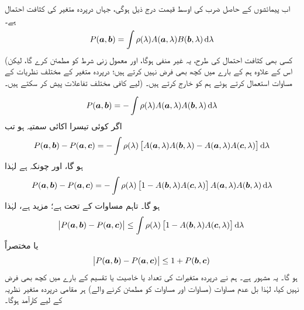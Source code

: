  اب پیمائشوں کے  حاصل ضرب کی اوسط قیمت درج ذیل ہوگی،  جہاں  درپردہ متغیر کی کثافت احتمال ہے۔
\begin{align}
	P(\kvec{a}, \kvec{b}) = \int\rho(\lambda)A(\kvec{a}, \lambda)B(\kvec{b}, \lambda)\dif\lambda
\end{align}
(کسی بھی کثافت  احتمال کی طرح،  یہ غیر منفی ہوگا،  اور معمول زنی شرط  کو مطمئن کرے گا،  لیکن  اس کے علاوہ ہم  کے بارے میں کچھ بھی فرض نہیں کرتے ہیں؛  درپردہ متغیر کے مختلف نظریات  کے لیے کافی مختلف تفاعلات پیش کر سکتے ہیں۔) مساوات     استعمال کرتے ہوئے ہم  کو خارج کرتے ہیں۔


\begin{align}
	P(\kvec{a}, \kvec{b}) = -\int\rho(\lambda)A(\kvec{a}, \lambda)A(\kvec{b}, \lambda)\dif\lambda
\end{align}
اگر  کوئی تیسرا اکائی سمتیہ ہو تب
\begin{align}
	P(\kvec{a}, \kvec{b})-P(\kvec{a}, \kvec{c}) = -\int\rho(\lambda)\left[A(\kvec{a}, \lambda)A(\kvec{b}, \lambda)-A(\kvec{a}, \lambda)A(\kvec{c}, \lambda)\right]\dif\lambda
\end{align}
ہو گا، اور چونکہ  ہے لہٰذا   
\begin{align}
	P(\kvec{a}, \kvec{b})-P(\kvec{a}, \kvec{c}) =-\int\rho(\lambda)\left[1-A(\kvec{b}, \lambda)A(\kvec{c}, \lambda)\right]A(\kvec{a}, \lambda)A(\kvec{b}, \lambda)\dif\lambda
\end{align}
ہو گا۔ تاہم مساوات   کے تحت ہے؛   مزید
 ہے،  لہٰذا 
\begin{align}
	\abs{P(\kvec{a}, \kvec{b})-P(\kvec{a},\kvec{c})}\leq\int\rho(\lambda)\left[1-A(\kvec{b}, \lambda)A(\kvec{c}, \lambda)\right]\dif\lambda
\end{align}
یا مختصراً 
\begin{align}
	\abs{P({{\boldsymbol{a}}}, {{\boldsymbol{b}}})-P({{\boldsymbol{a}}}, {{\boldsymbol{c}}})}\leq1+P({{\boldsymbol{b}}}, {{\boldsymbol{c}}})
\end{align}
ہو گا۔ یہ  مشہور   ہے۔   ہم نے   درپردہ  متغیرات  کی تعداد یا خاصیت یا تقسیم  کے بارے میں کچھ بھی فرض نہیں کیا، لہٰذا بل  عدم مساوات  (مساوات   اور مساوات  کو مطمئن کرنے والے)  ہر مقامی درپردہ متغیر نظریہ کے لیے  کارآمد ہوگا۔


